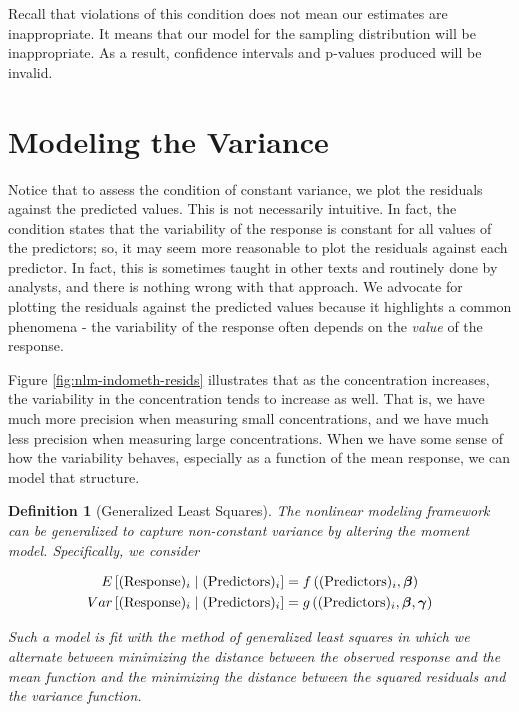 \documentclass[
]{book}
\theoremstyle{plain}
\theoremstyle{mydefn}
\newtheorem{definition}{Definition}[chapter]
\theoremstyle{myexmpl}
\theoremstyle{remark}
\begin{document}
Recall that violations of this condition does not mean our estimates are inappropriate. It means that our model for the sampling distribution will be inappropriate. As a result, confidence intervals and p-values produced will be invalid.

\hypertarget{modeling-the-variance}{%
\section{Modeling the Variance}\label{modeling-the-variance}}

Notice that to assess the condition of constant variance, we plot the residuals against the predicted values. This is not necessarily intuitive. In fact, the condition states that the variability of the response is constant for all values of the predictors; so, it may seem more reasonable to plot the residuals against each predictor. In fact, this is sometimes taught in other texts and routinely done by analysts, and there is nothing wrong with that approach. We advocate for plotting the residuals against the predicted values because it highlights a common phenomena - the variability of the response often depends on the \emph{value} of the response.

Figure \ref{fig:nlm-indometh-resids} illustrates that as the concentration increases, the variability in the concentration tends to increase as well. That is, we have much more precision when measuring small concentrations, and we have much less precision when measuring large concentrations. When we have some sense of how the variability behaves, especially as a function of the mean response, we can model that structure.

\begin{definition}[Generalized Least Squares]
\protect\hypertarget{def:nlm-gls}{}{\label{def:nlm-gls} {} }The nonlinear modeling framework can be generalized to capture non-constant variance by altering the moment model. Specifically, we consider

\[
\begin{aligned}
  E\left[(\text{Response})_i \mid (\text{Predictors})_i\right]
    &= f\left((\text{Predictors})_i, \boldsymbol{\beta}\right) \\
  Var\left[(\text{Response})_i \mid (\text{Predictors})_i\right]
    &= g\left((\text{Predictors})_i, \boldsymbol{\beta}, \boldsymbol{\gamma}\right)
\end{aligned}
\]

Such a model is fit with the method of generalized least squares in which we alternate between minimizing the distance between the observed response and the mean function and the minimizing the distance between the squared residuals and the variance function.
\end{definition}
\end{document}
